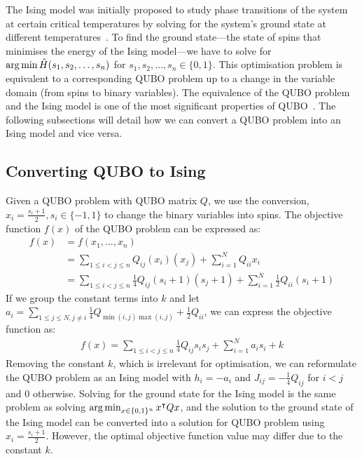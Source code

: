 The Ising model was initially proposed to study phase transitions of the system at certain critical temperatures by solving for the system's ground state at different temperatures~\cite{isingising}. To find the ground state---the state of spins that minimises the energy of the Ising model---we have to solve for $ \operatorname*{arg\,min} \Hat{H}(s_1, s_2, \ldots , s_n) $ for $ s_1, s_2, \ldots , s_n \in \{ 0, 1 \}$. This optimisation problem is equivalent to a corresponding QUBO problem up to a change in the variable domain (from spins to binary variables). The equivalence of the QUBO problem and the Ising model is one of the most significant properties of QUBO~\cite{b5}. The following subsections will detail how we can convert a QUBO problem into an Ising model and vice versa.

\subsection{Converting QUBO to Ising}\label{qubotoising}
Given a QUBO problem with QUBO matrix $Q$, we use the conversion, $x_i = \frac{s_i + 1}{2}, s_i \in \{-1, 1\}$ to change the binary variables into spins. The objective function $f(x)$ of the QUBO problem can be expressed as:
\begin{align}
    f(x) &= f(x_1, ..., x_n) \nonumber\\
    &= \sum_{1\leq i < j \leq n} Q_{ij}(x_i)(x_j) + \sum_{i=1}^N Q_{ii} x_i \nonumber \\
    &= \sum_{1\leq i < j \leq n} \frac{1}{4} Q_{ij}(s_i + 1)(s_j + 1) + \sum_{i=1}^N \frac{1}{2} Q_{ii} (s_i + 1) \nonumber
\end{align}
If we group the constant terms into $k$ and let $a_i = \sum_{1\leq j \leq N, j \neq i} \frac{1}{4}Q_{\min(i,j)\max(i,j)} + \frac{1}{2}Q_{ii}$, we can express the objective function as:
\begin{align}
    f(x) = \sum_{1\leq i < j \leq n} \frac{1}{4} Q_{ij}s_i s_j + \sum_{i=1}^N a_i s_i + k
\end{align}
Removing the constant $k$, which is irrelevant for optimisation, we can reformulate the QUBO problem as an Ising model with $h_i = -a_i$ and $J_{ij} = -\frac{1}{4}Q_{ij}$ for $i < j$ and $0$ otherwise. Solving for the ground state for the Ising model is the same problem as solving $\operatorname*{arg\,min}_{x \in \{0, 1\}^n} x^\intercal Q x$, and the solution to the ground state of the Ising model can be converted into a solution for QUBO problem using $x_i = \frac{s_i + 1}{2}$. However, the optimal objective function value may differ due to the constant $k$.

